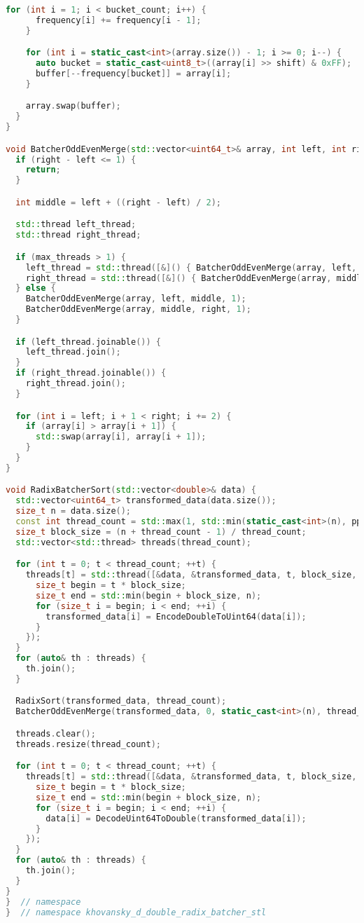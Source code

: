 \documentclass[12pt]{article}
\begin{document}
\begin{lstlisting}[language=C++,
    breaklines=true,       % Автоматический перенос строк
    columns=fullflexible ]
    for (int i = 1; i < bucket_count; i++) {
      frequency[i] += frequency[i - 1];
    }

    for (int i = static_cast<int>(array.size()) - 1; i >= 0; i--) {
      auto bucket = static_cast<uint8_t>((array[i] >> shift) & 0xFF);
      buffer[--frequency[bucket]] = array[i];
    }

    array.swap(buffer);
  }
}

void BatcherOddEvenMerge(std::vector<uint64_t>& array, int left, int right, int max_threads) {
  if (right - left <= 1) {
    return;
  }

  int middle = left + ((right - left) / 2);

  std::thread left_thread;
  std::thread right_thread;

  if (max_threads > 1) {
    left_thread = std::thread([&]() { BatcherOddEvenMerge(array, left, middle, max_threads / 2); });
    right_thread = std::thread([&]() { BatcherOddEvenMerge(array, middle, right, max_threads / 2); });
  } else {
    BatcherOddEvenMerge(array, left, middle, 1);
    BatcherOddEvenMerge(array, middle, right, 1);
  }

  if (left_thread.joinable()) {
    left_thread.join();
  }
  if (right_thread.joinable()) {
    right_thread.join();
  }

  for (int i = left; i + 1 < right; i += 2) {
    if (array[i] > array[i + 1]) {
      std::swap(array[i], array[i + 1]);
    }
  }
}

void RadixBatcherSort(std::vector<double>& data) {
  std::vector<uint64_t> transformed_data(data.size());
  size_t n = data.size();
  const int thread_count = std::max(1, std::min(static_cast<int>(n), ppc::util::GetPPCNumThreads()));
  size_t block_size = (n + thread_count - 1) / thread_count;
  std::vector<std::thread> threads(thread_count);

  for (int t = 0; t < thread_count; ++t) {
    threads[t] = std::thread([&data, &transformed_data, t, block_size, n]() {
      size_t begin = t * block_size;
      size_t end = std::min(begin + block_size, n);
      for (size_t i = begin; i < end; ++i) {
        transformed_data[i] = EncodeDoubleToUint64(data[i]);
      }
    });
  }
  for (auto& th : threads) {
    th.join();
  }

  RadixSort(transformed_data, thread_count);
  BatcherOddEvenMerge(transformed_data, 0, static_cast<int>(n), thread_count);

  threads.clear();
  threads.resize(thread_count);

  for (int t = 0; t < thread_count; ++t) {
    threads[t] = std::thread([&data, &transformed_data, t, block_size, n]() {
      size_t begin = t * block_size;
      size_t end = std::min(begin + block_size, n);
      for (size_t i = begin; i < end; ++i) {
        data[i] = DecodeUint64ToDouble(transformed_data[i]);
      }
    });
  }
  for (auto& th : threads) {
    th.join();
  }
}
}  // namespace
}  // namespace khovansky_d_double_radix_batcher_stl


\end{lstlisting}
\end{document}
